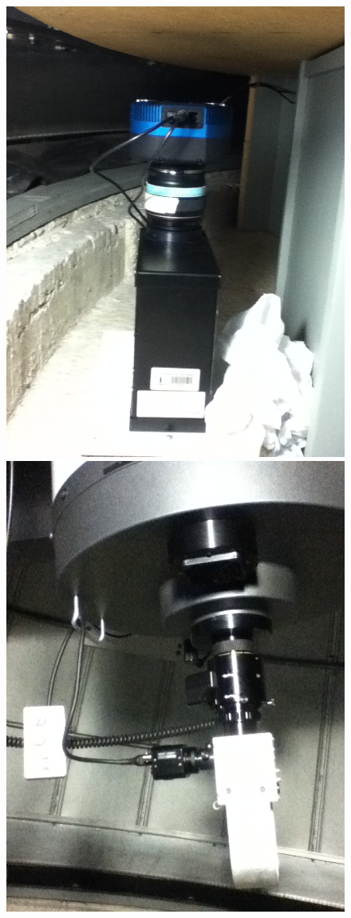 \documentclass[Proceedings]{ascelike}
\begin{document}
\begin{figure}
\centering
\includegraphics[scale=0.2]{espectroscopio.jpg}
\includegraphics[scale=0.2]{montaje.jpg}

\end{figure}
\end{document}
